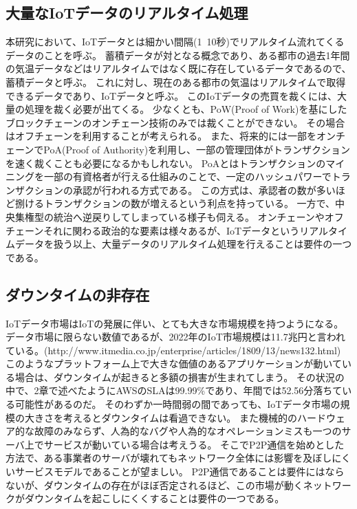 \subsection{大量なIoTデータのリアルタイム処理}
本研究において、IoTデータとは細かい間隔(1~10秒)でリアルタイム流れてくるデータのことを呼ぶ。
蓄積データが対となる概念であり、ある都市の過去1年間の気温データなどはリアルタイムではなく既に存在しているデータであるので、蓄積データと呼ぶ。
これに対し、現在のある都市の気温はリアルタイムで取得できるデータであり、IoTデータと呼ぶ。
このIoTデータの売買を裁くには、大量の処理を裁く必要が出てくる。
少なくとも、PoW(Proof of Work)を基にしたブロックチェーンのオンチェーン技術のみでは裁くことができない。
その場合はオフチェーンを利用することが考えられる。
また、将来的には一部をオンチェーンでPoA(Proof of Authority)を利用し、一部の管理団体がトランザクションを速く裁くことも必要になるかもしれない。
PoAとはトランザクションのマイニングを一部の有資格者が行える仕組みのことで、一定のハッシュパワーでトランザクションの承認が行われる方式である。
この方式は、承認者の数が多いほど捌けるトランザクションの数が増えるという利点を持っている。
一方で、中央集権型の統治へ逆戻りしてしまっている様子も伺える。
オンチェーンやオフチェーンそれに関わる政治的な要素は様々あるが、IoTデータというリアルタイムデータを扱う以上、大量データのリアルタイム処理を行えることは要件の一つである。

\subsection{ダウンタイムの非存在}
IoTデータ市場はIoTの発展に伴い、とても大きな市場規模を持つようになる。
データ市場に限らない数値であるが、2022年のIoT市場規模は11.7兆円と言われている。(http://www.itmedia.co.jp/enterprise/articles/1809/13/news132.html)
このようなプラットフォーム上で大きな価値のあるアプリケーションが動いている場合は、ダウンタイムが起きると多額の損害が生まれてしまう。
その状況の中で、2章で述べたようにAWSのSLAは99.99\%であり、年間では52.56分落ちている可能性があるのだ。
そのわずか一時間弱の間であっても、IoTデータ市場の規模の大きさを考えるとダウンタイムは看過できない。
また機械的のハードウェア的な故障のみならず、人為的なバグや人為的なオペレーションミスも一つのサーバ上でサービスが動いている場合は考えうる。
そこでP2P通信を始めとした方法で、ある事業者のサーバが壊れてもネットワーク全体には影響を及ぼしにくいサービスモデルであることが望ましい。
P2P通信であることは要件にはならないが、ダウンタイムの存在がほぼ否定されるほど、この市場が動くネットワークがダウンタイムを起こしにくくすることは要件の一つである。

